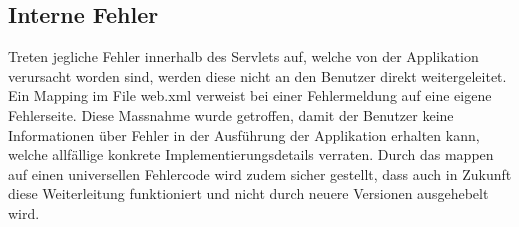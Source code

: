 \documentclass[12pt]{scrartcl}
\begin{document}
\subsection{Interne Fehler}
Treten jegliche Fehler innerhalb des Servlets auf, welche von der Applikation verursacht worden sind, werden diese nicht an den Benutzer direkt weitergeleitet. Ein Mapping im File web.xml verweist bei einer Fehlermeldung auf eine eigene Fehlerseite. Diese Massnahme wurde getroffen, damit der Benutzer keine Informationen über Fehler in der Ausführung der Applikation erhalten kann, welche allfällige konkrete Implementierungsdetails verraten. Durch das mappen auf einen universellen Fehlercode wird zudem sicher gestellt, dass auch in Zukunft diese Weiterleitung funktioniert und nicht durch neuere Versionen ausgehebelt wird.
\end{document}
